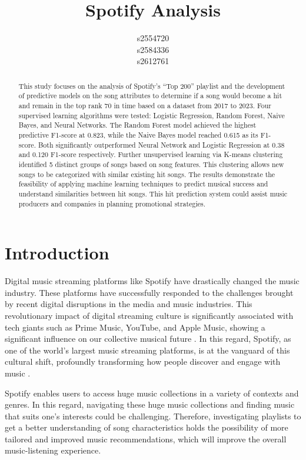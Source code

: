 \documentclass{article}
\title{Spotify Analysis}
\author{
  s2554720\\
  \And
  s2584336\\
 \And
  s2612761\\
}
\begin{document}
\maketitle
\begin{abstract}
This study focuses on the analysis of Spotify’s “Top 200” playlist and the development of predictive models on the song attributes to determine if a song would become a hit and remain in the top rank 70 in time based on a dataset from 2017 to 2023. Four supervised learning algorithms were tested: Logistic Regression, Random Forest, Naive Bayes, and Neural Networks. The Random Forest model achieved the highest predictive F1-score at 0.823, while the Naive Bayes model reached 0.615 as its F1-score. Both significantly outperformed Neural Network and Logistic Regression at 0.38 and 0.120 F1-score respectively. Further unsupervised learning via K-means clustering identified 5 distinct groups of songs based on song features. This clustering allows new songs to be categorized with similar existing hit songs. The results demonstrate the feasibility of applying machine learning techniques to predict musical success and understand similarities between hit songs. This hit prediction system could assist music producers and companies in planning promotional strategies.
\end{abstract}

\section{Introduction}
Digital music streaming platforms like Spotify have drastically changed the music industry. These platforms have successfully responded to the challenges brought by recent digital disruptions in the media and music industries. This revolutionary impact of digital streaming culture is significantly associated with tech giants such as Prime Music, YouTube, and Apple Music, showing a significant influence on our collective musical future \cite{fleischer2017discovering}. In this regard, Spotify, as one of the world's largest music streaming platforms, is at the vanguard of this cultural shift, profoundly transforming how people discover and engage with music \cite{pinter2020p4kxspotify} \cite{jones2022competing}.

Spotify enables users to access huge music collections in a variety of contexts and genres. In this regard, navigating these huge music collections and finding music that suits one's interests could be challenging. Therefore, investigating playlists to get a better understanding of song characteristics holds the possibility of more tailored and improved music recommendations, which will improve the overall music-listening experience.
\end{document}
